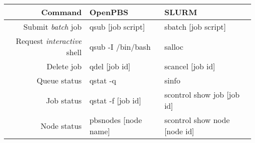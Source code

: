 \small
{\renewcommand{\arraystretch}{1.2}%
\begin{tabularx}{\textwidth}{r|X|X}
\toprule
{\bf Command} & {\bf OpenPBS} & {\bf SLURM}  \\
\midrule

Submit {\em batch} job &
qsub [job script] &
sbatch [job script]
\\ \hline

Request {\em interactive} shell &
qsub -I /bin/bash &
salloc 
\\ \hline

Delete job &
qdel [job id] &
scancel [job id]
\\ \hline

Queue status &
qstat -q &
sinfo
\\ \hline

Job status &
qstat -f [job id]  &
scontrol show job [job id]
\\ \hline

Node status &
pbsnodes [node name] &
scontrol show node [node id]
\\ \hline

\bottomrule
\end{tabularx}}



